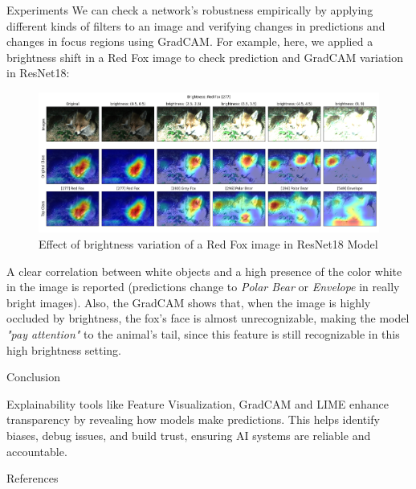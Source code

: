 \documentclass[final]{beamer}
\newlength{\colwidth}
\begin{document}
\begin{frame}[t]
\begin{columns}[t]
\begin{column}{\colwidth}
  \begin{block}{Experiments}
    We can check a network's robustness empirically by applying different kinds of filters 
    to an image and verifying changes in predictions and changes in focus regions using GradCAM.
    For example, here, we applied a brightness shift in a Red Fox image to check prediction and GradCAM variation in ResNet18:

    \begin{figure}
      \centering
      \includegraphics[width=0.96\linewidth]{images/fox-grad-cam-exp.png}
      \caption{Effect of brightness variation of a Red Fox image in ResNet18 Model}
    \end{figure}

    A clear correlation between white objects and a high presence of the color white in the image is reported 
    (predictions change to \textit{Polar Bear} or \textit{Envelope} in really bright images).
    Also, the GradCAM shows that, when the image is highly occluded by brightness, the fox's face is almost unrecognizable, 
    making the model \textit{"pay attention"} to the animal's tail, since this feature is still recognizable in this high brightness setting.
  \end{block}

  \begin{block}{Conclusion}

    Explainability tools like Feature Visualization, GradCAM and LIME enhance transparency by revealing how models make predictions. 
    This helps identify biases, debug issues, and build trust, ensuring AI systems are reliable and accountable.
  \end{block}

  \begin{block}{References}
    \nocite{*}
    

  \end{block}

\end{column}

\end{columns}
\end{frame}
\end{document}
